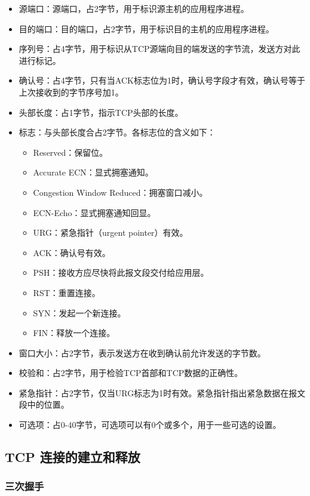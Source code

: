 \documentclass{article}
\begin{document}
	\begin{itemize}[noitemsep]
		\item 源端口：源端口，占2字节，用于标识源主机的应用程序进程。
		\item 目的端口：目的端口，占2字节，用于标识目的主机的应用程序进程。
		\item 序列号：占4字节，用于标识从TCP源端向目的端发送的字节流，发送方对此进行标记。
		\item 确认号：占4字节，只有当ACK标志位为1时，确认号字段才有效，确认号等于上次接收到的字节序号加1。
		\item 头部长度：占1字节，指示TCP头部的长度。
		\item 标志：与头部长度合占2字节。各标志位的含义如下：
	
		\begin{itemize}[noitemsep]
			\item Reserved：保留位。
			\item Accurate ECN：显式拥塞通知。
			\item Congestion Window Reduced：拥塞窗口减小。
			\item ECN-Echo：显式拥塞通知回显。
			\item URG：紧急指针（urgent pointer）有效。
			\item ACK：确认号有效。
			\item PSH：接收方应尽快将此报文段交付给应用层。
			\item RST：重置连接。
			\item SYN：发起一个新连接。
			\item FIN：释放一个连接。
		\end{itemize}
		\item 窗口大小：占2字节，表示发送方在收到确认前允许发送的字节数。
		\item 校验和：占2字节，用于检验TCP首部和TCP数据的正确性。
		\item 紧急指针：占2字节，仅当URG标志为1时有效。紧急指针指出紧急数据在报文段中的位置。
		\item 可选项：占0-40字节，可选项可以有0个或多个，用于一些可选的设置。
	\end{itemize}
	
	\subsection{TCP 连接的建立和释放}
	
	\subsubsection{三次握手}
	
\end{document}
